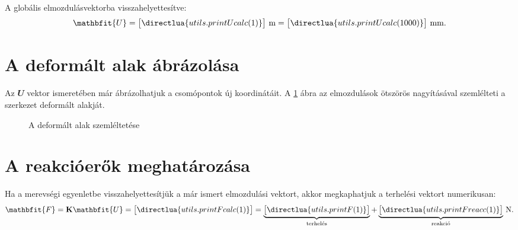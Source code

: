 \documentclass[a4paper, 12pt]{scrartcl}
\newcommand{\rvec}[1]{\mathbfit{#1}}
\newcommand{\rmat}[1]{\mathbf{#1}}
\begin{document}
A globális elmozdulásvektorba visszahelyettesítve:
\begin{equation}
  {\rvec U} = \begin{bmatrix}
    \directlua{utils.printUcalc(1)}
  \end{bmatrix} \, \mathrm{m}
  =
  \sisetup{
    exponent-mode = fixed,
    round-precision = 3
  }
  \begin{bmatrix}
    \directlua{utils.printUcalc(1000)}
  \end{bmatrix} \, \mathrm{mm}.
  \label{eq:Ucalc}
\end{equation}




\section{A deformált alak ábrázolása} %
\label{sec:A deformált alak ábrázolása}

Az $\rvec U$ vektor ismeretében már ábrázolhatjuk a csomópontok új koordinátáit.
A \ref{fig:deformed} ábra az elmozdulások ötszörös nagyításával szemlélteti a
szerkezet deformált alakját.

\begin{figure}[H]
  \centering
  
  \caption{A deformált alak szemléltetése}
  \label{fig:deformed}
\end{figure}




\section{A reakcióerők meghatározása} %
\label{sec:A reakcióerők meghatározása}

Ha a merevségi egyenletbe visszahelyettesítjük a már ismert elmozdulási vektort,
akkor megkaphatjuk a terhelési vektort numerikusan:
\begin{equation}
  \rvec F = \rmat K \rvec U =
  \sisetup{
    exponent-mode = fixed,
    round-precision = 3
  }
  \begin{bmatrix}
    \directlua{utils.printFcalc(1)}
  \end{bmatrix}
  =
  \underbrace{\begin{bmatrix}
      \directlua{utils.printF(1)}
    \end{bmatrix}}_\text{terhelés}
  +
  \underbrace{\begin{bmatrix}
      \directlua{utils.printFreacc(1)}
    \end{bmatrix}}_\text{reakció}
  \, \mathrm{N}.
  \label{eq:Fcalc}
\end{equation}
\end{document}
